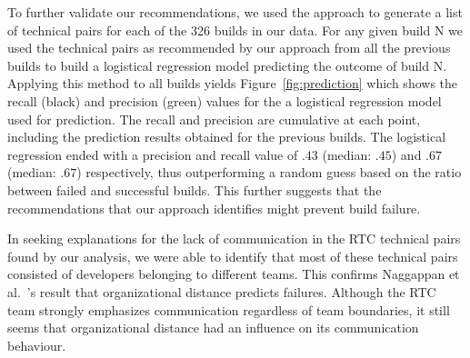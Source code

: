 To further validate our recommendations, we used the approach to generate a list of technical pairs for each of the 326 builds in our data. For any given build N we used the technical pairs as recommended by our approach from all the previous builds to build a logistical regression model predicting the outcome of build N. 
Applying this method to all builds yields Figure~\ref{fig:prediction} which shows the recall (black) and precision (green) values for the a logistical regression model used for prediction.
The recall and precision are cumulative at each point, including the prediction results obtained for the previous builds.
The logistical regression ended with a precision and recall value of $.43$ (median: $.45$) and $.67$ (median: $.67$) respectively, thus outperforming a random guess based on the ratio between failed and successful builds.
This further suggests that the recommendations that our approach identifies might prevent build failure. 


In seeking explanations for the lack of communication in the RTC technical pairs found by our analysis, we were able to identify that most of these technical pairs consisted of developers belonging to
different teams. This confirms Naggappan et al.~\cite{nagappan:icse:2008}'s result that organizational distance predicts failures. Although the RTC team strongly emphasizes communication
regardless of team boundaries, it still seems that organizational distance had
an influence on its communication behaviour.




